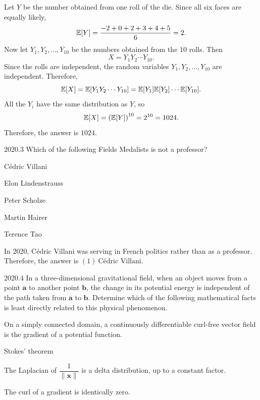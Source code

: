     \begin{solution}
        Let $Y$ be the number obtained from one roll of the die. Since all six faces are equally
        likely,
        \[
            \mathbb{E}[Y]
            =
            \frac{-2+0+2+3+4+5}{6}
            =
            2.
        \]
        Now let $Y_1,Y_2,\dots,Y_{10}$ be the numbers obtained from the $10$ rolls. Then
        \[
            X=Y_1Y_2\cdots Y_{10}.
        \]
        Since the rolls are independent, the random variables $Y_1,Y_2,\dots,Y_{10}$ are
        independent. Therefore,
        \[
            \mathbb{E}[X]
            =
            \mathbb{E}[Y_1Y_2\cdots Y_{10}]
            =
            \mathbb{E}[Y_1]\mathbb{E}[Y_2]\cdots\mathbb{E}[Y_{10}].
        \]
        All the $Y_i$ have the same distribution as $Y$, so
        \[
            \mathbb{E}[X]
            =
            \left(\mathbb{E}[Y]\right)^{10}
            =
            2^{10}
            =
            1024.
        \]
        Therefore, the answer is $\boxed{1024}$.
    \end{solution}

    \begin{pastproblem}{2020.3}
        Which of the following Fields Medalists is not a professor?
        \begin{problemchoices}
            \item Cédric Villani
            \item Elon Lindenstrauss
            \item Peter Scholze
            \item Martin Hairer
            \item Terence Tao
        \end{problemchoices}
    \end{pastproblem}

    \begin{solution}
        In 2020, Cédric Villani was serving in French politics rather than as a professor.
        Therefore, the answer is $\boxed{(1)\ \text{Cédric Villani}}$.
    \end{solution}

    \begin{pastproblem}{2020.4}
        In a three-dimensional gravitational field, when an object moves from a
        point $\mathbf{a}$ to another point $\mathbf{b}$, the change in its
        potential energy is independent of the path taken from $\mathbf{a}$ to
        $\mathbf{b}$. Determine which of the following mathematical facts is
        least directly related to this physical phenomenon.
        \begin{problemchoices}
            \item On a simply connected domain, a continuously differentiable curl-free vector field is the gradient of a potential function.
            \item Stokes' theorem
            \item The Laplacian of \(\dfrac{1}{\lVert\mathbf{x}\rVert}\) is a delta distribution, up to a constant factor.
            \item The curl of a gradient is identically zero.
        \end{problemchoices}
    \end{pastproblem}


